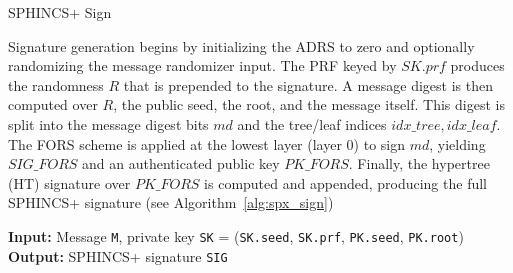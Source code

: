 \documentclass [version=submission]{iacrcc}
\begin{document}
\begin{subsection}{SPHINCS+ Sign}

Signature generation begins by initializing the ADRS to zero and optionally randomizing the message randomizer input. The PRF keyed by \(\mathit{SK}.\mathit{prf}\) produces the randomness \(R\) that is prepended to the signature. A message digest is then computed over \(R\), the public seed, the root, and the message itself. This digest is split into the message digest bits \(\mathit{md}\) and the tree/leaf indices \(\mathit{idx\_tree},\mathit{idx\_leaf}\). The FORS scheme is applied at the lowest layer (layer 0) to sign \(\mathit{md}\), yielding \(\mathit{SIG\_FORS}\) and an authenticated public key \(\mathit{PK\_FORS}\). Finally, the hypertree (HT) signature over \(\mathit{PK\_FORS}\) is computed and appended, producing the full SPHINCS+ signature (see Algorithm~\ref{alg:spx_sign})

\begin{algorithm}
    \caption{spx\_sign -- Generating a SPHINCS+ signature}
    \label{alg:spx_sign}
    \textbf{Input:} Message \texttt{M}, private key \texttt{SK} = (\texttt{SK.seed}, \texttt{SK.prf}, \texttt{PK.seed}, \texttt{PK.root}) \\
    \textbf{Output:} SPHINCS+ signature \texttt{SIG}

    \vspace{0.2cm}


\end{algorithm}
\end{subsection}
\end{document}
